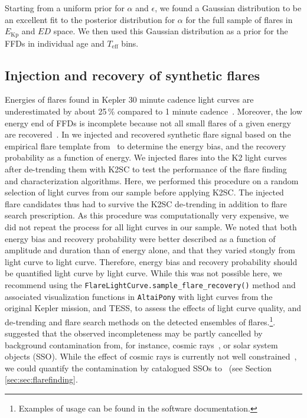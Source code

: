 \documentclass{aa}
\begin{document}
Starting from a uniform prior for $\alpha$ and $\epsilon$, we found a Gaussian distribution to be an excellent fit to the posterior distribution for $\alpha$ for the full sample of flares in $E_\mathrm{Kp}$ and $ED$ space. We then used this Gaussian distribution as a prior for the FFDs in individual age and $T_\mathrm{eff}$ bins. 
\subsection{Injection and recovery of synthetic flares}
\label{sec:sec:injrec}
Energies of flares found in Kepler 30 minute cadence light curves are underestimated by about 25\,\% compared to 1 minute cadence~\citep{yang_flaresampling_2018}. Moreover, the low energy end of FFDs is incomplete because not all small flares of a given energy are recovered~\citep{davenport_kepler_2016}. In  we injected and recovered synthetic flare signal based on the empirical flare template from~\citet{davenport_kepler_2014} to determine the energy bias, and the recovery probability as a function of energy. We injected flares into the K2 light curves after de-trending them with K2SC to test the performance of the flare finding and characterization algorithms. Here, we performed this procedure on a random selection of light curves from our sample before applying K2SC. The injected flare candidates thus had to survive the K2SC de-trending in addition to flare search prescription. As this procedure was computationally very expensive, we did not repeat the process for all light curves in our sample. We noted that both energy bias and recovery probability were better described as a function of amplitude and duration than of energy alone, and that they varied stongly from light curve to light curve. Therefore, energy bias and recovery probability should be quantified light curve by light curve. While this was not possible here, we recommend using the \texttt{FlareLightCurve.sample\_flare\_recovery()} method and associated visualization functions in \texttt{AltaiPony} with light curves from the original Kepler mission, and TESS, to assess the effects of light curve quality, and de-trending and flare search methods on the detected ensembles of flares.\footnote{Examples of usage can be found in the software documentation.}. \citet{aschwanden_powerlaws_2015} suggested that the observed incompleteness may be partly cancelled by background contamination from, for instance, cosmic rays~, or solar system objects (SSO). While the effect of cosmic rays is currently not well constrained~, we could quantify the contamination by catalogued SSOs to ~(see Section \ref{sec:sec:flarefinding}.
\end{document}
